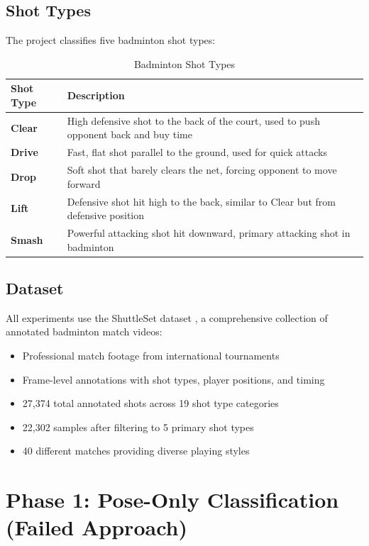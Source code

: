 \documentclass[12pt,a4paper]{article}
\begin{document}
\subsection{Shot Types}

The project classifies five badminton shot types:

\begin{table}[H]
\centering
\caption{Badminton Shot Types}
\begin{tabular}{lp{8cm}}
\toprule
Shot Type & Description \\
\midrule
\textbf{Clear} & High defensive shot to the back of the court, used to push opponent back and buy time \\
\textbf{Drive} & Fast, flat shot parallel to the ground, used for quick attacks \\
\textbf{Drop} & Soft shot that barely clears the net, forcing opponent to move forward \\
\textbf{Lift} & Defensive shot hit high to the back, similar to Clear but from defensive position \\
\textbf{Smash} & Powerful attacking shot hit downward, primary attacking shot in badminton \\
\bottomrule
\end{tabular}
\end{table}

\subsection{Dataset}

All experiments use the ShuttleSet dataset \cite{ShuttleSet}, a comprehensive collection of annotated badminton match videos:

\begin{itemize}
\item Professional match footage from international tournaments
\item Frame-level annotations with shot types, player positions, and timing
\item 27,374 total annotated shots across 19 shot type categories
\item 22,302 samples after filtering to 5 primary shot types
\item 40 different matches providing diverse playing styles
\end{itemize}

\section{Phase 1: Pose-Only Classification (Failed Approach)}
\end{document}
